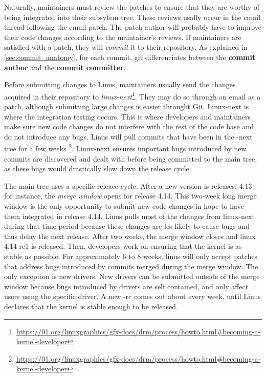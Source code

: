 Naturally, maintainers must review the patches to ensure that they are worthy of being integrated into their subsytem tree. These reviews usally occur in the email thread following the email patch. The patch author will probably have to improve their code changes according to the maintainer's reviews. If maintainers are satisfied with a patch, they will \textit{commit} it to their repository. As explained in \autoref{sec:commit_anatomy}, for each commit, git differenciates between the \textbf{commit author} and the \textbf{commit committer}. 

Before submitting changes to Linus, maintainers usually send the changes acquired in their repository to \textit{linux-next}\footnote{\url{https://01.org/linuxgraphics/gfx-docs/drm/process/howto.html\#becoming-a-kernel-developer}}. They may do so through an email as a patch, although submitting large changes is easier throught Git. Linux-next is where the integration testing occurs. This is where developers and maintainers make sure new code changes do not interfere with the rest of the code base and do not introduce any bugs. Linus will pull commits that have been in the -next tree for a few weeks \footnote{\url{https://01.org/linuxgraphics/gfx-docs/drm/process/howto.html\#becoming-a-kernel-developer}}. Linux-next ensures important bugs introduced by new commits are discovered and dealt with before being committed to the main tree, as these bugs would drastically slow down the release cycle. 


The main tree uses a specific releace cycle. After a new version is releases, 4.13 for instance, the \textit{merge window} opens for release 4.14. This two-week long merge window is the only opportunity to submit new code changes in hope to have them integrated in release 4.14. Linus pulls most of the changes from linux-next during that time period because these changes are les likely to cause bugs and thus delay the next release. After two weeks, the merge window closes and linux 4.14-rc1 is released. Then, developers work on ensuring that the kernel is as stable as possible. For approximately 6 to 8 weeks, linus will only accept patches that address bugs introduced by commits merged during the merge window. The only exception is new drivers. New drivers can be submitted outside of the merge window because bugs introduced by drivers are self contained, and only affect users using the specific driver. A new -rc comes out about every week, until Linus declares that the kernel is stable enough to be released. 

